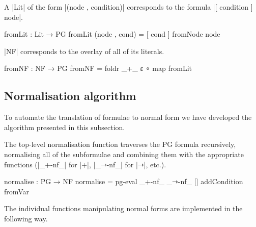 A |Lit| of the form |(node , condition)| corresponds to the formula |[ condition ] node|.


\begin{code}
   fromLit : Lit → PG
   fromLit (node , cond) = [ cond ] fromNode node
\end{code}

|NF| corresponds to the overlay of all of its literals.


\begin{code}
   fromNF : NF → PG
   fromNF = foldr _+_ ε ∘ map fromLit
\end{code}


\subsection{Normalisation algorithm}

To automate the translation of formulae to normal form we have developed the algorithm presented in this subsection.


The top-level normalisation function traverses the PG formula recursively, normalising all of the subformulae and combining them with the appropriate functions (|_+-nf_| for |+|, |_⇾-nf_| for |⇾|, etc.).

\begin{code}
  normalise : PG → NF
  normalise = pg-eval
                _+-nf_
                _⇾-nf_
                []
                addCondition
                fromVar
\end{code}

The individual functions manipulating normal forms are implemented in the following way.

